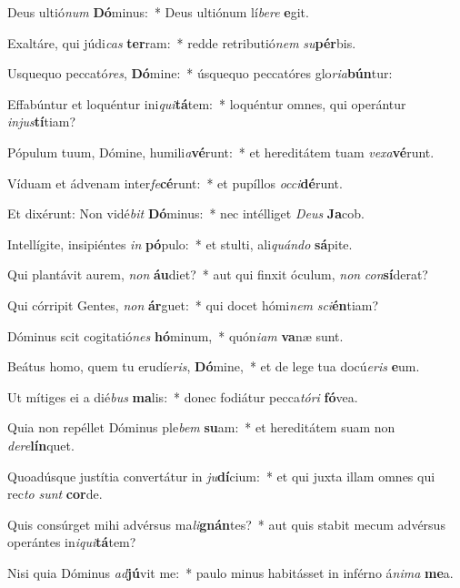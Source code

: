 \item Deus ultió\textit{num} \textbf{Dó}minus:~* Deus ultiónum lí\textit{be}\textit{re} \textbf{e}git.
\item Exaltáre, qui júdi\textit{cas} \textbf{ter}ram:~* redde retributió\textit{nem} \textit{su}\textbf{pér}bis.
\item Usquequo peccató\textit{res}, \textbf{Dó}mine:~* úsquequo peccatóres glo\textit{ri}\textit{a}\textbf{bún}tur:
\item Effabúntur et loquéntur ini\textit{qui}\textbf{tá}tem:~* loquéntur omnes, qui operántur \textit{in}\textit{jus}\textbf{tí}tiam?
\item Pópulum tuum, Dómine, humili\textit{a}\textbf{vé}runt:~* et hereditátem tuam \textit{ve}\textit{xa}\textbf{vé}runt.
\item Víduam et ádvenam inter\textit{fe}\-\textbf{cé}runt:~* et pupíllos \textit{oc}\textit{ci}\textbf{dé}runt.
\item Et dixérunt: Non vidé\textit{bit} \textbf{Dó}minus:~* nec intélliget \textit{De}\textit{us} \textbf{Ja}cob.
\item Intellígite, insipiéntes \textit{in} \textbf{pó}pulo:~* et stulti, ali\textit{quán}\textit{do} \textbf{sá}pite.
\item Qui plantávit aurem, \textit{non} \textbf{áu}diet?~* aut qui finxit óculum, \textit{non} \textit{con}\textbf{sí}derat?
\item Qui córripit Gentes, \textit{non} \textbf{ár}guet:~* qui docet hómi\textit{nem} \textit{sci}\textbf{én}tiam?
\item Dóminus scit cogitatió\textit{nes} \textbf{hó}minum,~* quón\textit{i}\textit{am} \textbf{va}næ sunt.
\item Beátus homo, quem tu erudíe\textit{ris}, \textbf{Dó}mine,~* et de lege tua docú\textit{e}\textit{ris} \textbf{e}um.
\item Ut mítiges ei a dié\textit{bus} \textbf{ma}lis:~* donec fodiátur pecca\textit{tó}\textit{ri} \textbf{fó}vea.
\item Quia non repéllet Dóminus ple\textit{bem} \textbf{su}am:~* et hereditátem suam non \textit{de}\textit{re}\textbf{lín}quet.
\item Quoadúsque justítia convertátur in \textit{ju}\textbf{dí}cium:~* et qui juxta illam omnes qui rec\textit{to} \textit{sunt} \textbf{cor}de.
\item Quis consúrget mihi advérsus ma\textit{li}\textbf{gnán}tes?~* aut quis stabit mecum advérsus operántes in\textit{i}\textit{qui}\textbf{tá}tem?
\item Nisi quia Dóminus \textit{ad}\textbf{jú}vit me:~* paulo minus habitásset in inférno á\textit{ni}\textit{ma} \textbf{me}a.
